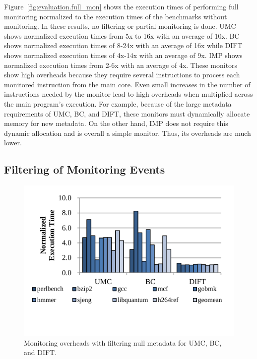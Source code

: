 Figure~\ref{fig:evaluation.full_mon} shows the execution times of
performing full monitoring normalized to the execution times of the benchmarks
without monitoring. In these results, no filtering or partial monitoring is
done. UMC shows normalized execution times from 5x to 16x with an average
of 10x. BC shows normalized execution times of 8-24x with an average of
16x while DIFT shows normalized execution times of 4x-14x with an average of
9x. IMP shows normalized execution times from 2-6x with an average of 4x. 
These monitors show high overheads because they require several
instructions to process each monitored instruction from the main core. Even
small increases in the number of instructions needed by the monitor lead to
high overheads when multiplied across the main program's execution. For
example, because of the large metadata requirements of UMC, BC, and DIFT, these
monitors must dynamically allocate memory for new metadata. On the other hand,
IMP does not require this dynamic allocation and is overall a simple monitor.
Thus, its overheads are much lower.


\subsection{Filtering of Monitoring Events}

\begin{figure}
  \begin{center}
    \includegraphics[width=\columnwidth]{figs/data_filtering.pdf}
    \vspace{-0.2in}
    \caption{Monitoring overheads with filtering null metadata for UMC, BC, and DIFT.}
    \label{fig:evaluation.filtering}
    \vspace{-0.1in}
  \end{center}
\end{figure}

